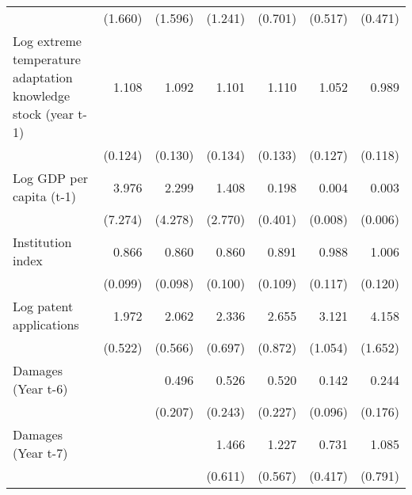 \begin{table}[htbp]
\begin{tabular}{l*{6}{D{.}{.}{-1}}}
                    &     (1.660)         &     (1.596)         &     (1.241)         &     (0.701)         &     (0.517)         &     (0.471)         \\
\addlinespace
Log extreme temperature adaptation knowledge stock (year t-1)&       1.108         &       1.092         &       1.101         &       1.110         &       1.052         &       0.989         \\
                    &     (0.124)         &     (0.130)         &     (0.134)         &     (0.133)         &     (0.127)         &     (0.118)         \\
\addlinespace
Log GDP per capita (t-1)&       3.976         &       2.299         &       1.408         &       0.198         &       0.004\sym{**} &       0.003\sym{**} \\
                    &     (7.274)         &     (4.278)         &     (2.770)         &     (0.401)         &     (0.008)         &     (0.006)         \\
\addlinespace
Institution index   &       0.866         &       0.860         &       0.860         &       0.891         &       0.988         &       1.006         \\
                    &     (0.099)         &     (0.098)         &     (0.100)         &     (0.109)         &     (0.117)         &     (0.120)         \\
\addlinespace
Log patent applications&       1.972\sym{**} &       2.062\sym{***}&       2.336\sym{***}&       2.655\sym{***}&       3.121\sym{***}&       4.158\sym{***}\\
                    &     (0.522)         &     (0.566)         &     (0.697)         &     (0.872)         &     (1.054)         &     (1.652)         \\
\addlinespace
Damages (Year t-6)  &                     &       0.496\sym{*}  &       0.526         &       0.520\sym{\%}  &       0.142\sym{***}&       0.244\sym{*}  \\
                    &                     &     (0.207)         &     (0.243)         &     (0.227)         &     (0.096)         &     (0.176)         \\
\addlinespace
Damages (Year t-7)  &                     &                     &       1.466         &       1.227         &       0.731         &       1.085         \\
                    &                     &                     &     (0.611)         &     (0.567)         &     (0.417)         &     (0.791)         \\

\end{tabular}
\end{table}
